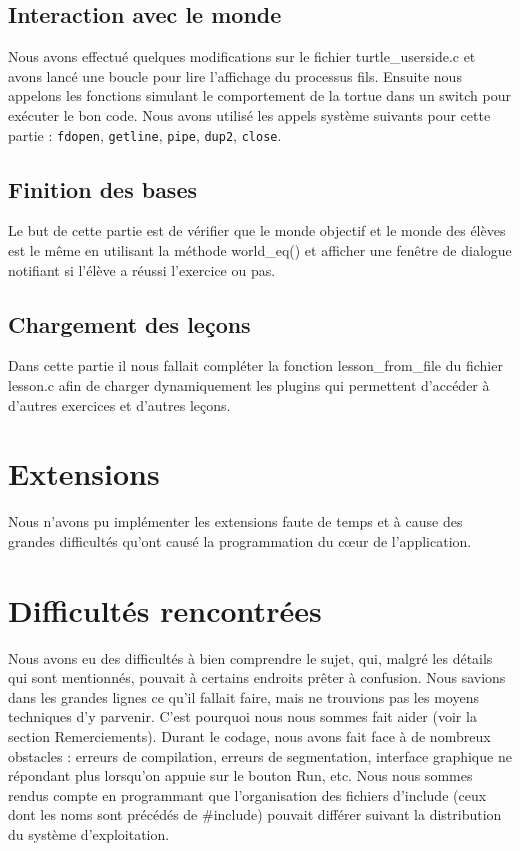 \documentclass[a4paper, 12pt]{article}
\begin{document}
\subsection{Interaction avec le monde}
Nous avons effectué quelques modifications sur le fichier turtle\_userside.c et avons lancé une boucle pour lire l'affichage du processus fils. Ensuite nous appelons les fonctions simulant le comportement de la tortue dans un switch pour exécuter le bon code.\newline
Nous avons utilisé les appels système suivants pour cette partie : \texttt{fdopen}, \texttt{getline}, \texttt{pipe}, \texttt{dup2}, \texttt{close}.
\subsection{Finition des bases}
Le but de cette partie est de vérifier que le monde objectif et le monde des élèves est le même en utilisant la méthode world\_eq() et afficher une fenêtre de dialogue notifiant si l'élève a réussi l'exercice ou pas.
\subsection{Chargement des leçons}
Dans cette partie il nous fallait compléter la fonction lesson\_from\_file du fichier lesson.c afin de charger dynamiquement les plugins qui permettent d'accéder à d'autres exercices et d'autres leçons.
\section{Extensions}
Nous n'avons pu implémenter les extensions faute de temps et à cause des grandes difficultés qu'ont causé la programmation du c\oe ur de l'application.

\section{Difficultés rencontrées}
Nous avons eu des difficultés à bien comprendre le sujet, qui, malgré les détails qui sont mentionnés, pouvait à certains endroits prêter à confusion. 
Nous savions dans les grandes lignes ce qu'il fallait faire, mais ne trouvions pas les moyens techniques d'y parvenir. C'est pourquoi nous nous sommes fait aider (voir la section Remerciements).
Durant le codage, nous avons fait face à de nombreux obstacles : erreurs de compilation, erreurs de segmentation, interface graphique ne répondant plus lorsqu'on appuie sur le bouton Run, etc.
Nous nous sommes rendus compte en programmant que l'organisation des fichiers d'include (ceux dont les noms sont précédés de \#include) pouvait différer suivant la distribution du système d'exploitation.
\end{document}
